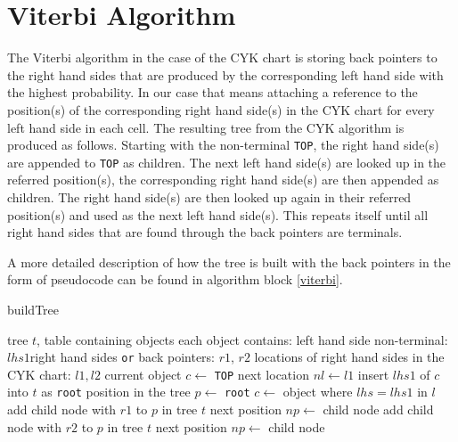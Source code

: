 \documentclass[11pt,twocolumn]{article}
\begin{document}
\section{Viterbi Algorithm}
The Viterbi algorithm in the case of the CYK chart is storing back pointers to the right hand sides that are produced by the corresponding left hand side with the highest probability. In our case that means attaching a reference to the position(s) of the corresponding right hand side(s) in the CYK chart for every left hand side in each cell. The resulting tree from the CYK algorithm is produced as follows. Starting with the non-terminal \texttt{TOP}, the right hand side(s) are appended to \texttt{TOP} as children. The next left hand side(s) are looked up in the referred position(s), the corresponding right hand side(s) are then appended as children. The right hand side(s) are then looked up again in their referred position(s) and used as the next left hand side(s). This repeats itself until all right hand sides that are found through the back pointers are terminals.

A more detailed description of how the tree is built with the back pointers in the form of pseudocode can be found in algorithm block \ref{viterbi}.

\begin{algorithm}[!htb]
\caption{buildTree}
\label{viterbi}
\begin{algorithmic}[1]
\Require tree $t$, table containing objects
\Ensure each object contains: \newline
left hand side non-terminal: $lhs1$\newline right hand sides \texttt{or} back pointers: $r1$, $r2$\newline
locations of right hand sides in the CYK chart: $l1, l2$
\State current object $c \gets$ \texttt{TOP} 
\State next location $nl \gets l1$
\State insert $lhs1$ of $c$ into $t$ as \texttt{root}
\State position in the tree $p \gets$ \texttt{root}
\State {}
\State $c \gets$ object where $lhs=lhs1$ in $l$
\State add child node with $r1$ to $p$ in tree $t$
\State next position $np \gets$ child node
\State {} 
\State add child node with $r2$ to $p$ in tree $t$
\State next position $np \gets$ child node
\State {} 
\EndIf
\EndProcedure
\end{algorithmic}
\end{algorithm}
\end{document}
